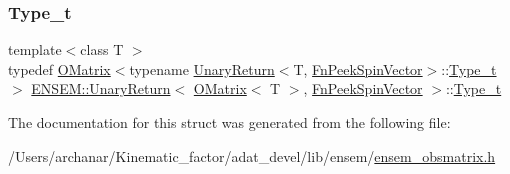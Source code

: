 \subsubsection{\texorpdfstring{Type\_t}{Type\_t}\hspace{0.1cm}{\footnotesize\ttfamily [2/2]}}
{\footnotesize\ttfamily template$<$class T $>$ \\
typedef \mbox{\hyperlink{classENSEM_1_1OMatrix}{O\+Matrix}}$<$typename \mbox{\hyperlink{structENSEM_1_1UnaryReturn}{Unary\+Return}}$<$T, \mbox{\hyperlink{structENSEM_1_1FnPeekSpinVector}{Fn\+Peek\+Spin\+Vector}}$>$\+::\mbox{\hyperlink{structENSEM_1_1UnaryReturn_3_01OMatrix_3_01T_01_4_00_01FnPeekSpinVector_01_4_a995bd2c849af30377b0fa17937b63f19}{Type\+\_\+t}}$>$ \mbox{\hyperlink{structENSEM_1_1UnaryReturn}{E\+N\+S\+E\+M\+::\+Unary\+Return}}$<$ \mbox{\hyperlink{classENSEM_1_1OMatrix}{O\+Matrix}}$<$ T $>$, \mbox{\hyperlink{structENSEM_1_1FnPeekSpinVector}{Fn\+Peek\+Spin\+Vector}} $>$\+::\mbox{\hyperlink{structENSEM_1_1UnaryReturn_3_01OMatrix_3_01T_01_4_00_01FnPeekSpinVector_01_4_a995bd2c849af30377b0fa17937b63f19}{Type\+\_\+t}}}



The documentation for this struct was generated from the following file\+:\begin{DoxyCompactItemize}
\item 
/\+Users/archanar/\+Kinematic\+\_\+factor/adat\+\_\+devel/lib/ensem/\mbox{\hyperlink{lib_2ensem_2ensem__obsmatrix_8h}{ensem\+\_\+obsmatrix.\+h}}\end{DoxyCompactItemize}
